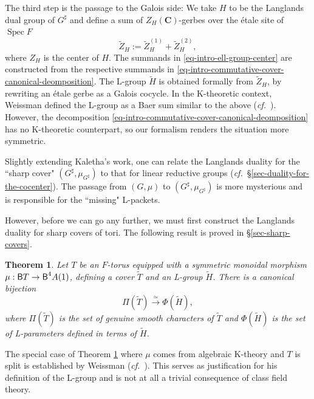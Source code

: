 \documentclass[10pt,english,reqno]{amsart}
\newcommand{\complexes}{\mathbf C}
\newcommand{\deloop}{\textnormal{\textsf{B}}}
\newcommand{\Spec}{\operatorname{Spec}}
\newtheorem{thmx}{Theorem}
\theoremstyle{definition}
\numberwithin{equation}{section}
\begin{document}
The third step is the passage to the Galois side: We take $H$ to be the Langlands dual group of $G^{\sharp}$ and define a sum of $Z_H(\complexes)$-gerbes over the \'etale site of $\Spec F$
\begin{equation}
\label{eq-intro-ell-group-center}
\widetilde Z_H := \widetilde Z_H^{(1)} + \widetilde Z_H^{(2)},
\end{equation}
where $Z_H$ is the center of $H$. The summands in \eqref{eq-intro-ell-group-center} are constructed from the respective summands in \eqref{eq-intro-commutative-cover-canonical-deomposition}. The L-group $\widetilde H$ is obtained formally from $\widetilde Z_H$, by rewriting an \'etale gerbe as a Galois cocycle. In the K-theoretic context, Weissman defined the L-group as a Baer sum similar to the above (\emph{cf.}~\cite{MR3802418}). However, the decomposition \eqref{eq-intro-commutative-cover-canonical-deomposition} has no K-theoretic counterpart, so our formalism renders the situation more symmetric.

Slightly extending Kaletha's work, one can relate the Langlands duality for the ``sharp cover" $(G^{\sharp}, \mu_{G^{\sharp}})$ to that for linear reductive groups (\emph{cf.}~\S\ref{sec-duality-for-the-cocenter}). The passage from $(G, \mu)$ to $(G^{\sharp}, \mu_{G^{\sharp}})$ is more mysterious and is responsible for the ``missing" L-packets.

However, before we can go any further, we must first construct the Langlands duality for sharp covers of tori. The following result is proved in \S\ref{sec-sharp-covers}.


\begin{thmx}
\label{thmx-duality-sharp-torus}
Let $T$ be an $F$-torus equipped with a symmetric monoidal morphism $\mu : \deloop T \rightarrow \deloop^4A(1)$, defining a cover $\widetilde T$ and an L-group $\widetilde H$. There is a canonical bijection
$$
\Pi(\widetilde T) \xrightarrow{\simeq} \Phi(\widetilde H),
$$
where $\Pi(\widetilde T)$ is the set of genuine smooth characters of $\widetilde T$ and $\Phi(\widetilde H)$ is the set of L-parameters defined in terms of $\widetilde H$.
\end{thmx}

The special case of Theorem \ref{thmx-duality-sharp-torus} where $\mu$ comes from algebraic K-theory and $T$ is split is established by Weissman (\emph{cf.}~\cite[Part 3]{MR3802418}). This serves as justification for his definition of the L-group and is not at all a trivial consequence of class field theory.
\end{document}
